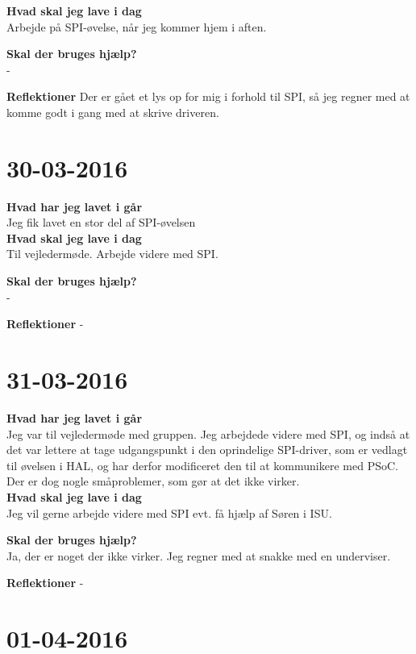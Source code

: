 \documentclass{article}
\begin{document}
	\textbf{Hvad skal jeg lave i dag}\\
	Arbejde på SPI-øvelse, når jeg kommer hjem i aften.     
	
	\textbf{Skal der bruges hjælp?}\\
	-
	
	\textbf{Reflektioner}
	Der er gået et lys op for mig i forhold til SPI, så jeg regner med at komme godt i gang med at skrive driveren.
	
	
	
	\section{30-03-2016}
	
	\textbf{Hvad har jeg lavet i går}\\
	Jeg fik lavet en stor del af SPI-øvelsen\\
	
	\textbf{Hvad skal jeg lave i dag}\\
	Til vejledermøde. Arbejde videre med SPI.
	
	\textbf{Skal der bruges hjælp?}\\
	-
	
	\textbf{Reflektioner}
	-	
	
	
	
	\section{31-03-2016}
	
	\textbf{Hvad har jeg lavet i går}\\
	Jeg var til vejledermøde med gruppen.
	Jeg arbejdede videre med SPI, og indså at det var lettere at tage udgangspunkt i den oprindelige SPI-driver, som er vedlagt til øvelsen i HAL, og har derfor modificeret den til at kommunikere med PSoC. Der er dog nogle småproblemer, som gør at det ikke virker.\\
	
	\textbf{Hvad skal jeg lave i dag}\\
	Jeg vil gerne arbejde videre med SPI evt. få hjælp af Søren i ISU.
	
	\textbf{Skal der bruges hjælp?}\\
	Ja, der er noget der ikke virker. Jeg regner med at snakke med en underviser.
	
	\textbf{Reflektioner}
	-
	
	
	
	\section{01-04-2016}
	
\end{document}
